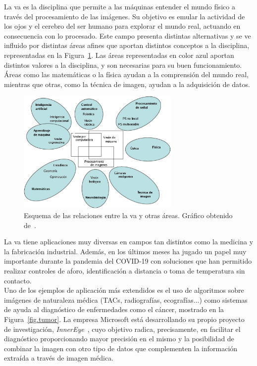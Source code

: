 La \acrfull{va} es la disciplina que permite a las máquinas entender el mundo físico a través del procesamiento de las imágenes. Su objetivo es emular la actividad de los ojos y el cerebro del ser humano para explorar el mundo real, actuando en consecuencia con lo procesado. Este campo presenta distintas alternativas y se ve influido por distintas áreas afines que aportan distintos conceptos a la disciplina, representadas en la Figura~\ref{fig.vision}. Las áreas representadas en color azul aportan distintos valores a la disciplina, y son necesarias para su buen funcionamiento. Áreas como las matemáticas o la física ayudan a la comprensión del mundo real, mientras que otras, como la técnica de imagen, ayudan a la adquisición de datos.

\vspace{20pt}
\begin{figure}[H]
		\begin{center}
			\includegraphics[width=0.7\textwidth]{figures/intro/vision.jpg}
			\caption{Esquema de las relaciones entre la \acrshort{va} y otras áreas. Gráfico obtenido de~\cite{vision}.}
			\label{fig.vision}
		\end{center}
\end{figure}
\vspace{-10pt}



La \acrshort{va} tiene aplicaciones muy diversas en campos tan distintos como la medicina y la fabricación industrial. Además, en los últimos meses ha jugado un papel muy importante durante la pandemia del COVID-19 con soluciones que han permitido realizar controles de aforo, identificación a distancia o toma de temperatura sin contacto.\\

Uno de los ejemplos de aplicación más extendidos es el uso de algoritmos sobre imágenes de naturaleza médica (TACs, radiografías, ecografías...) como sistemas de ayuda al diagnóstico de enfermedades como el cáncer, mostrado en la Figura~\ref{fig.tumor}. La empresa Microsoft está desarrollando su propio proyecto de investigación, \textit{InnerEye}~\cite{innereye}, cuyo objetivo radica, precisamente, en facilitar el diagnóstico proporcionando mayor precisión en el mismo y la posibilidad de combinar la imagen con otro tipo de datos que complementen la información extraída a través de imagen médica.

